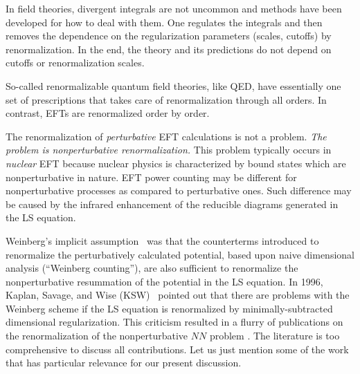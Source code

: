 \documentclass[sort&compress,preprint,3p]{elsarticle}
\begin{document}
In field theories, divergent integrals are not uncommon and methods have
been developed for how to deal with them.
One regulates the integrals and then removes the dependence
on the regularization parameters (scales, cutoffs)
by renormalization. In the end, the theory and its
predictions do not depend on cutoffs
or renormalization scales.

So-called renormalizable quantum field theories, like QED,
have essentially one set of prescriptions 
that takes care of renormalization through all orders. 
In contrast, 
EFTs are renormalized order by order. 

The renormalization of {\it perturbative}
EFT calculations is not a problem. {\it The problem
is nonperturbative renormalization.}
This problem typically occurs in {\it nuclear} EFT because
nuclear physics is characterized by bound states which
are nonperturbative in nature.
EFT power counting may be different for nonperturbative processes as
compared to perturbative ones. Such difference may be caused by the infrared
enhancement of the reducible diagrams generated in the LS equation.

Weinberg's implicit assumption~\cite{Wei90,Wei09} was that the counterterms
introduced to renormalize the perturbatively calculated
potential, based upon naive dimensional analysis (``Weinberg counting''),
are also sufficient to renormalize the nonperturbative
resummation of the potential in the LS equation.
In 1996, Kaplan, Savage, and Wise (KSW)~\cite{KSW96}
pointed out that there are problems with the Weinberg scheme
if the LS equation is renormalized 
by minimally-subtracted dimensional regularization.
This criticism resulted in a flurry of publications on
the renormalization of the nonperturbative
$NN$ problem
\cite{FMS00,PBC98,FTT99,Bir06,Bea02,VA05-1,NTK05,VA05-2,VA07,EM06,VA08,Ent08,YEP07,LK08,BKV08,Val08,ME10}.
The literature is too comprehensive
to discuss all contributions.
Let us just mention some of the work that has particular relevance
for our present discussion.
\end{document}
